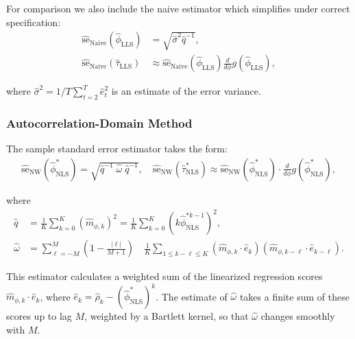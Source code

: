 \documentclass[docs/main.tex]{subfiles}
\begin{document}
\noindent For comparison we also include the naive estimator which simplifies under correct specification:
\begin{align}
    \widehat{\text{se}}_\text{Naive}(\hat\phi_{\scriptscriptstyle\text{LLS}}) &= \sqrt{\hat\sigma^2 \hat q^{-1}},\\
    \widehat{\text{se}}_\text{Naive}(\hat\tau_{\scriptscriptstyle\text{LLS}}) &\approx \widehat{\text{se}}_{\text{Naive}}(\hat\phi_{\scriptscriptstyle\text{LLS}}) \frac{d}{d\phi} g(\hat\phi_{\scriptscriptstyle\text{LLS}}),
\end{align}

\noindent where $\hat\sigma^2 = 1/T \sum_{t=2}^T \hat e_t^2$ is an estimate of the error variance.

\subsubsection{Autocorrelation-Domain Method}\label{sec:stderr-autocorrelation-domain_}
The sample standard error estimator takes the form:
\begin{align}\label{eq:stderr-autocorrelation-domain_}
\widehat{\text{se}}_{\text{NW}}(\hat\phi^*_{\scriptscriptstyle\text{NLS}}) = \sqrt{\hat q^{-1}\;\hat\omega\; \hat q^{-1}}, \quad
\widehat{\text{se}}_{\text{NW}}(\hat\tau^*_{\scriptscriptstyle\text{NLS}}) \approx \widehat{\text{se}}_{\text{NW}}(\hat\phi^*_{\scriptscriptstyle\text{NLS}}) \cdot \frac{d}{d\phi} g(\hat\phi^*_{\scriptscriptstyle\text{NLS}}),
\end{align}

\noindent where
\begin{align}
    \hat q &= \frac{1}{K} \sum_{k=0}^K (\hat m_{\phi,k})^2 = \frac{1}{K} \sum_{k=0}^K (k \hat\phi_{\scriptscriptstyle\text{NLS}}^{*k-1})^2,\\
    \hat \omega &= \sum_{\ell=-M}^M \left(1 - \frac{|\ell|}{M+1}\right) \quad \frac{1}{K} \sum_{1 \le k - \ell \le K} (\hat m_{\phi, k} \cdot \hat e_k) (\hat m_{\phi, k-\ell} \cdot \hat e_{k-\ell}).\label{eq:nls_q_omega_}
\end{align}

\noindent This estimator calculates a weighted sum of the linearized regression scores $\hat m_{\phi, k} \cdot \hat e_k$, where $\hat e_k = \hat\rho_k - (\hat\phi^*_{\scriptscriptstyle\text{NLS}})^k$. The estimate of $\hat\omega$ takes a finite sum of these scores up to lag $M$, weighted by a Bartlett kernel, so that $\hat\omega$ changes smoothly with $M$.\\
\end{document}
